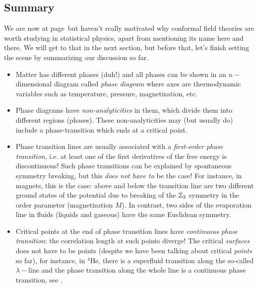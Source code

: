 \subsection{Summary}
We are now at page~\thepage\;but haven't really motivated why conformal field theories are worth studying in statistical physics, apart from mentioning its name here and there. We will get to that in the next section, but before that, let's finish setting the scene by summarizing our discussion so far.
\begin{itemize}
	\item Matter has different phases (duh!) and all phases can be shown in an $n-$dimensional diagram called \emph{phase diagram} where axes are thermodynamic variables such as temperature, pressure, magnetization, etc.
	\item Phase diagrams have \emph{non-analyticities} in them, which divide them into different regions (phases). These non-analyticities may (but usually do) include a phase-transition which ends at a critical point.
	\item Phase transition lines are usually associated with a \emph{first-order phase transition}, i.e. at least one of the first derivatives of the free energy is discontinuous! Such phase transitions can be explained by spontaneous symmetry breaking, but this \emph{does not have to} be the case! For instance, in magnets, this is the case: above and below the transition line are two different ground states of the potential due to breaking of the $\mathbb{Z}_2$ symmetry in the order parameter (magnetization $M$). In contrast, two sides of the evaporation line in fluids (liquids and gaseous) have the same Euclidean symmetry.
	\item Critical points at the end of phase transition lines have \emph{continuous phase transition}: the correlation length at such points diverge! The critical \emph{surfaces} does not have to be points (despite we have been talking about critical \emph{points} so far), for instance, in $^{4}$He, there is a superfluid transition along the so-called $\lambda-$line and the phase transition along the whole line is a continuous phase transition, see \figref{\ref{fig: lambda line}}.
	

\end{itemize}
